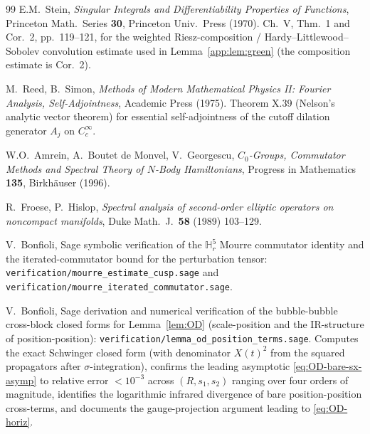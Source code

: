 \documentclass[11pt,letterpaper]{article}
\theoremstyle{definition}
\newcommand{\bbH}{\mathbb{H}}
\begin{document}
\begin{thebibliography}{99}
 E.M.\ Stein, \emph{Singular Integrals and Differentiability Properties of Functions}, Princeton Math.\ Series \textbf{30}, Princeton Univ.\ Press (1970). Ch.\ V, Thm.\ 1 and Cor.\ 2, pp.\ 119--121, for the weighted Riesz-composition / Hardy--Littlewood--Sobolev convolution estimate used in Lemma~\ref{app:lem:green} (the composition estimate is Cor.\ 2).

 M.\ Reed, B.\ Simon, \emph{Methods of Modern Mathematical Physics II: Fourier Analysis, Self-Adjointness}, Academic Press (1975). Theorem X.39 (Nelson's analytic vector theorem) for essential self-adjointness of the cutoff dilation generator $A_j$ on $C_c^\infty$.

 W.O.\ Amrein, A.\ Boutet de Monvel, V.\ Georgescu, \emph{$C_0$-Groups, Commutator Methods and Spectral Theory of $N$-Body Hamiltonians}, Progress in Mathematics \textbf{135}, Birkh\"auser (1996).

 R.\ Froese, P.\ Hislop, \emph{Spectral analysis of second-order elliptic operators on noncompact manifolds}, Duke Math.\ J.\ \textbf{58} (1989) 103--129.

 V.\ Bonfioli, Sage symbolic verification of the $\bbH^5_r$ Mourre commutator identity and the iterated-commutator bound for the perturbation tensor: \texttt{verification/mourre\_estimate\_cusp.sage} and \texttt{verification/mourre\_iterated\_commutator.sage}.

 V.\ Bonfioli, Sage derivation and numerical verification of the bubble-bubble cross-block closed forms for Lemma~\ref{lem:OD} (scale-position and the IR-structure of position-position): \texttt{verification/lemma\_od\_position\_terms.sage}. Computes the exact Schwinger closed form (with denominator $X(t)^2$ from the squared propagators after $\sigma$-integration), confirms the leading asymptotic \eqref{eq:OD-bare-sx-asymp} to relative error $<10^{-3}$ across $(R, s_1, s_2)$ ranging over four orders of magnitude, identifies the logarithmic infrared divergence of bare position-position cross-terms, and documents the gauge-projection argument leading to \eqref{eq:OD-horiz}.

\end{thebibliography}
\end{document}
